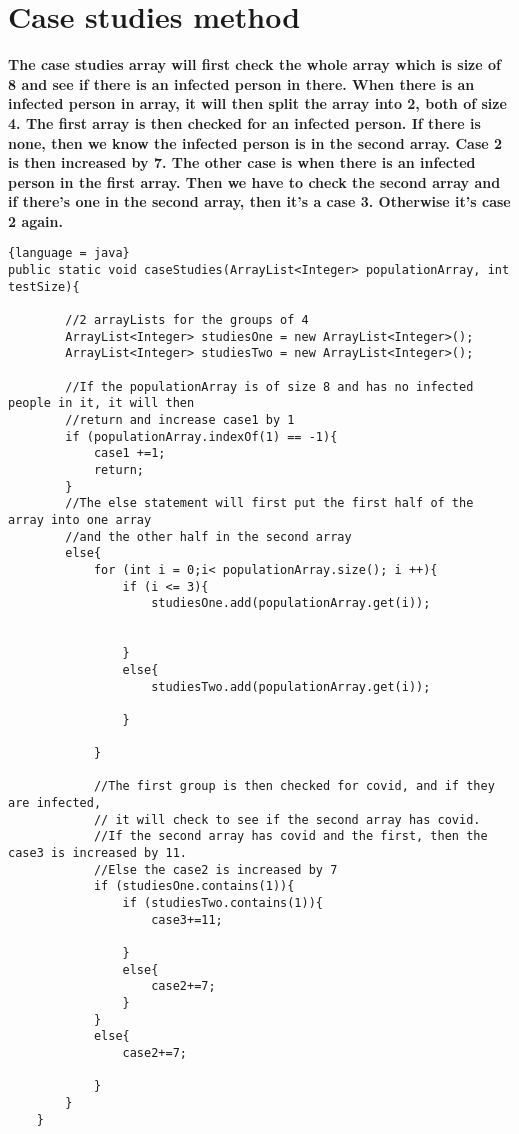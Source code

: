 \documentclass{article}
\begin{document}
\section{Case studies method}
\textbf{ The case studies array will first check the whole array which is size of 8 and see if there is an infected person in there. When there is an infected person in array, it will then split the array into 2, both of size 4. The first array is then checked for an infected person. If there is none, then we know the infected person is in the second array. Case 2 is then increased by 7. The other case is when there is an infected person in the first array. Then we have to check the second array and if there's one in the second array, then it's a case 3. Otherwise it's case 2 again.}
\begin{lstlisting}{language = java}
public static void caseStudies(ArrayList<Integer> populationArray, int testSize){

        //2 arrayLists for the groups of 4
        ArrayList<Integer> studiesOne = new ArrayList<Integer>();
        ArrayList<Integer> studiesTwo = new ArrayList<Integer>();

        //If the populationArray is of size 8 and has no infected people in it, it will then
        //return and increase case1 by 1
        if (populationArray.indexOf(1) == -1){
            case1 +=1; 
            return;
        }
        //The else statement will first put the first half of the array into one array
        //and the other half in the second array
        else{
            for (int i = 0;i< populationArray.size(); i ++){
                if (i <= 3){
                    studiesOne.add(populationArray.get(i));


                }
                else{
                    studiesTwo.add(populationArray.get(i));

                }

            }  
            
            //The first group is then checked for covid, and if they are infected,
            // it will check to see if the second array has covid.
            //If the second array has covid and the first, then the case3 is increased by 11.
            //Else the case2 is increased by 7
            if (studiesOne.contains(1)){
                if (studiesTwo.contains(1)){
                    case3+=11;
                    
                }
                else{
                    case2+=7;
                }
            }
            else{
                case2+=7;

            }
        }
    }

\end{lstlisting}
\end{document}
